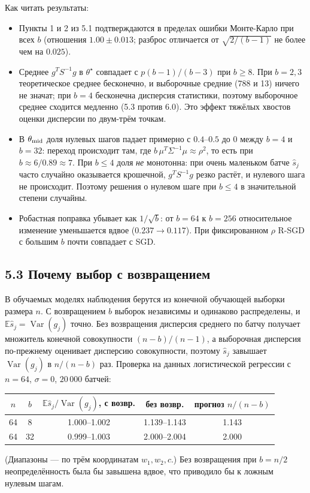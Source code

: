 \documentclass[11pt,a4paper]{article}
\newcommand{\E}{\mathbb{E}}
\DeclareMathOperator{\Var}{Var}
\begin{document}
Как читать результаты:
\begin{itemize}
\item Пункты 1 и 2 из 5.1 подтверждаются в пределах ошибки Монте-Карло при всех $b$
(отношения $1.00\pm0.013$; разброс отличается от $\sqrt{2/(b-1)}$ не более чем на
$0.025$).
\item Среднее $g^TS^{-1}g$ в $\theta^\star$ совпадает с $p(b-1)/(b-3)$ при $b\ge8$.
При $b=2,3$ теоретическое среднее бесконечно, и выборочные средние (788 и 13) ничего не
значат; при $b=4$ бесконечна дисперсия статистики, поэтому выборочное среднее сходится
медленно (5.3 против 6.0). Это эффект тяжёлых хвостов оценки дисперсии по двум-трём
точкам.
\item В $\theta_{\rm mid}$ доля нулевых шагов падает примерно с $0.4$--$0.5$ до $0$
между $b=4$ и $b=32$: переход происходит там, где $b\,\mu^T\Sigma^{-1}\mu\approx\rho^2$,
то есть при $b\approx6/0.89\approx7$. При $b\le4$ доля \emph{не} монотонна: при очень
маленьком батче $\widehat s_j$ часто случайно оказывается крошечной, $g^TS^{-1}g$
резко растёт, и нулевого шага не происходит. Поэтому решения о нулевом шаге при $b\le4$
в значительной степени случайны.
\item Робастная поправка убывает как $1/\sqrt b$: от $b=64$ к $b=256$ относительное
изменение уменьшается вдвое ($0.237\to0.117$). При фиксированном $\rho$ R-SGD с большим
$b$ почти совпадает с SGD.
\end{itemize}

\subsection*{5.3 Почему выбор с возвращением}

В обучаемых моделях наблюдения берутся из конечной обучающей выборки размера $n$. С
возвращением $b$ выборок независимы и одинаково распределены, и
$\E\widehat s_j=\Var(g_j)$ точно. Без возвращения дисперсия среднего по батчу получает
множитель конечной совокупности $(n-b)/(n-1)$, а выборочная дисперсия по-прежнему
оценивает дисперсию совокупности, поэтому $\widehat s_j$ завышает $\Var(g_j)$ в
$n/(n-b)$ раз. Проверка на данных логистической регрессии с $n=64$, $\sigma=0$,
$20\,000$ батчей:

\begin{center}
\begin{tabular}{@{}ccccc@{}}
\toprule
$n$ & $b$ & $\E\widehat s_j/\Var(g_j)$, с возвр. & без возвр. & прогноз $n/(n-b)$ \\
\midrule
64 & 8 & 1.000--1.002 & 1.139--1.143 & 1.143 \\
64 & 32 & 0.999--1.003 & 2.000--2.004 & 2.000 \\
\bottomrule
\end{tabular}
\end{center}
(Диапазоны — по трём координатам $w_1,w_2,c$.) Без возвращения при $b=n/2$
неопределённость была бы завышена вдвое, что приводило бы к ложным нулевым шагам.
\end{document}
